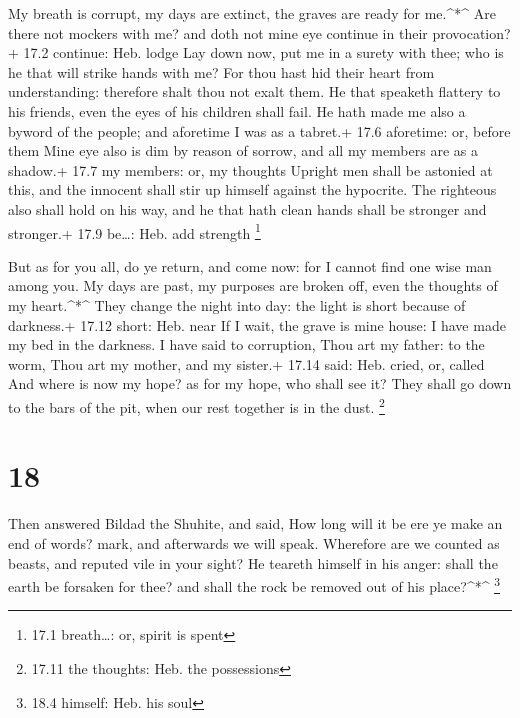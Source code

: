  My breath is corrupt, my days are extinct, the graves are
ready for me.\^{}*\^{}  Are there not mockers with me? and
doth not mine eye continue in their provocation?+ 17.2 continue: Heb.
lodge  Lay down now, put me in a surety with thee; who is he
that will strike hands with me?  For thou hast hid their
heart from understanding: therefore shalt thou not exalt them.
 He that speaketh flattery to his friends, even the eyes of
his children shall fail.  He hath made me also a byword of
the people; and aforetime I was as a tabret.+ 17.6 aforetime: or, before
them  Mine eye also is dim by reason of sorrow, and all my
members are as a shadow.+ 17.7 my members: or, my thoughts 
Upright men shall be astonied at this, and the innocent shall stir up
himself against the hypocrite.  The righteous also shall
hold on his way, and he that hath clean hands shall be stronger and
stronger.+ 17.9 be\ldots: Heb. add strength \footnote{17.1 breath\ldots:
  or, spirit is spent}

 But as for you all, do ye return, and come now: for I
cannot find one wise man among you.  My days are past, my
purposes are broken off, even the thoughts of my heart.\^{}*\^{}
 They change the night into day: the light is short because
of darkness.+ 17.12 short: Heb. near  If I wait, the grave
is mine house: I have made my bed in the darkness.  I have
said to corruption, Thou art my father: to the worm, Thou art my mother,
and my sister.+ 17.14 said: Heb. cried, or, called  And
where is now my hope? as for my hope, who shall see it? 
They shall go down to the bars of the pit, when our rest together is in
the dust. \footnote{17.11 the thoughts: Heb. the possessions}

\hypertarget{section-17}{%
\section{18}\label{section-17}}

 Then answered Bildad the Shuhite, and said, 
How long will it be ere ye make an end of words? mark, and afterwards we
will speak.  Wherefore are we counted as beasts, and reputed
vile in your sight?  He teareth himself in his anger: shall
the earth be forsaken for thee? and shall the rock be removed out of his
place?\^{}*\^{} \footnote{18.4 himself: Heb. his soul}

